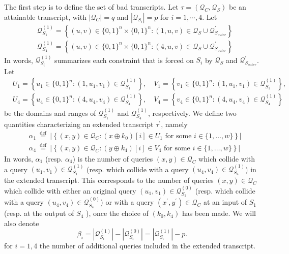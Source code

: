 The first step is to define the set of bad transcripts. Let $\tau = (\mathcal{Q}_C, \mathcal{Q}_{S})$ be an attainable transcript, with $|\mathcal{Q}_C| = q$ and $|\mathcal{Q}_{S_i}| = p$ for $i = 1, \cdots, 4$. Let
%
$$
\begin{aligned}
&\mathcal{Q}_{S_{1}}^{(1)}=\left\{(u, v) \in\{0,1\}^{n} \times\{0,1\}^{n}:(1, u, v) \in \mathcal{Q}_{S} \cup \mathcal{Q}_{S_{outer}}^{\prime}\right\}\\
&\mathcal{Q}_{S_{4}}^{(1)}=\left\{(u, v) \in\{0,1\}^{n} \times\{0,1\}^{n}:(4, u, v) \in \mathcal{Q}_{S} \cup \mathcal{Q}_{S_{outer}}^{\prime}\right\}
\end{aligned}
$$
%
In words, $\mathcal{Q}_{S_{i}}^{(1)}$ summarizes each constraint that is forced on $S_{i}$ by $\mathcal{Q}_{S}$ and $\mathcal{Q}_{S_{outer}}^{\prime}$. Let 
%
$$
\begin{aligned}
&U_{1}=\left\{u_{1} \in\{0,1\}^{n}:\left(1, u_{1}, v_{1}\right) \in \mathcal{Q}_{S_{1}}^{(1)}\right\}, \quad V_{1}=\left\{v_{1} \in\{0,1\}^{n}:\left(1, u_{1}, v_{1}\right) \in \mathcal{Q}_{S_{1}}^{(1)}\right\},\\
&U_{4}=\left\{u_{4} \in\{0,1\}^{n}:\left(4, u_{4}, v_{4}\right) \in \mathcal{Q}_{S_{4}}^{(1)}\right\}, \quad V_{4}=\left\{v_{4} \in\{0,1\}^{n}:\left(4, u_{4}, v_{4}\right) \in \mathcal{Q}_{S_{4}}^{(1)}\right\}
\end{aligned}
$$
%
be the domains and ranges of $\mathcal{Q}_{S_{1}}^{(1)}$ and $\mathcal{Q}_{S_{4}}^{(1)}$, respectively. We define two quantities characterizing an extended transcript $\tau^{\prime}$, namely
%
$$
\begin{aligned}
&\alpha_{1} \stackrel{\text { def }}{=} |\left\{(x, y) \in \mathcal{Q}_{C}: \left(x \oplus k_{0}\right)[i] \in U_{1} \text { for some } i \in\{1, \ldots, w\}\right\} |\\
&\alpha_{4} \stackrel{\text { def }}{=} |\left\{(x, y) \in \mathcal{Q}_{C}: \left(y \oplus k_{4}\right)[i] \in V_{4} \text { for some } i \in\{1, \ldots, w\}\right\} |
\end{aligned}
$$
%
In words, $\alpha_1$ (resp. $\alpha_4$) is the number of queries $(x, y) \in \mathcal{Q}_{C}$ which collide with a query $\left(u_{1}, v_{1}\right) \in \mathcal{Q}_{S_{1}}^{(1)}$ (resp. which collide with a query $\left(u_{4}, v_{4}\right) \in \mathcal{Q}_{S_{4}}^{(1)}$) in the extended transcript. This corresponds to the number of queries $(x, y) \in \mathcal{Q}_{C}$ which collide with either an original query $\left(u_{1}, v_{1}\right) \in \mathcal{Q}_{S_{1}}^{(0)}$ (resp. which collide with a query $\left(u_{4}, v_{4}\right) \in \mathcal{Q}_{S_{4}}^{(0)}$) or with a query $\left(x^{\prime}, y^{\prime}\right) \in \mathcal{Q}_{C}$ at an input of $S_1$ (resp. at the output of $S_4$ ), once the choice of $\left(k_{0}, k_{4}\right)$  has been made. We will also denote
%
$$
\beta_{i}=\left|\mathcal{Q}_{S_{i}}^{(1)}\right|-\left|\mathcal{Q}_{S_{i}}^{(0)}\right|=\left|\mathcal{Q}_{S_{i}}^{(1)}\right|-p.
$$
%
for $i=1, 4$ the number of additional queries included in the extended transcript.



